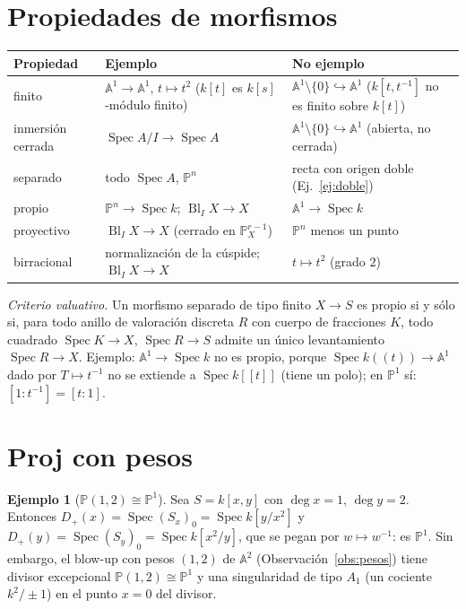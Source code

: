 \documentclass[11pt,a4paper,oneside]{book}
\newcommand{\Spec}{\operatorname{Spec}}
\newcommand{\Bl}{\operatorname{Bl}}
\newcommand{\A}{\mathbb{A}}
\newcommand{\PP}{\mathbb{P}}
\theoremstyle{plain}
\theoremstyle{definition}
\newtheorem{ejemplo}[teorema]{Ejemplo}
\theoremstyle{remark}
\begin{document}
\section{Propiedades de morfismos}

\begin{center}
\begin{tabular}{@{}p{2.4cm}p{5.4cm}p{4.9cm}@{}}
\toprule
Propiedad & Ejemplo & No ejemplo \\
\midrule
finito & $\A^1\to\A^1$, $t\mapsto t^2$ ($k[t]$ es $k[s]$-módulo finito) & $\A^1\setminus\{0\}\hookrightarrow\A^1$ ($k[t,t^{-1}]$ no es finito sobre $k[t]$) \\
inmersión cerrada & $\Spec A/I\to\Spec A$ & $\A^1\setminus\{0\}\hookrightarrow\A^1$ (abierta, no cerrada) \\
separado & todo $\Spec A$, $\PP^n$ & recta con origen doble (Ej.~\ref{ej:doble}) \\
propio & $\PP^n\to\Spec k$; $\Bl_IX\to X$ & $\A^1\to\Spec k$ \\
proyectivo & $\Bl_IX\to X$ (cerrado en $\PP^{r-1}_X$) & $\PP^n$ menos un punto \\
birracional & normalización de la cúspide; $\Bl_IX\to X$ & $t\mapsto t^2$ (grado $2$) \\
\bottomrule
\end{tabular}
\end{center}

\emph{Criterio valuativo.} Un morfismo separado de tipo finito $X\to S$ es propio si y sólo si, para todo anillo de valoración discreta $R$ con cuerpo de fracciones $K$, todo cuadrado $\Spec K\to X$, $\Spec R\to S$ admite un único levantamiento $\Spec R\to X$. Ejemplo: $\A^1\to\Spec k$ no es propio, porque $\Spec k((t))\to\A^1$ dado por $T\mapsto t^{-1}$ no se extiende a $\Spec k[[t]]$ (tiene un polo); en $\PP^1$ sí: $[1:t^{-1}]=[t:1]$.

\section{Proj con pesos}

\begin{ejemplo}[$\PP(1,2)\cong\PP^1$]\label{ej:pesos}
Sea $S=k[x,y]$ con $\deg x=1$, $\deg y=2$. Entonces $D_+(x)=\Spec(S_x)_0=\Spec k[y/x^2]$ y $D_+(y)=\Spec(S_y)_0=\Spec k[x^2/y]$, que se pegan por $w\mapsto w^{-1}$: es $\PP^1$. Sin embargo, el blow-up con pesos $(1,2)$ de $\A^2$ (Observación~\ref{obs:pesos}) tiene divisor excepcional $\PP(1,2)\cong\PP^1$ y una singularidad de tipo $A_1$ (un cociente $k^2/\pm1$) en el punto $x=0$ del divisor.
\end{ejemplo}
\end{document}
